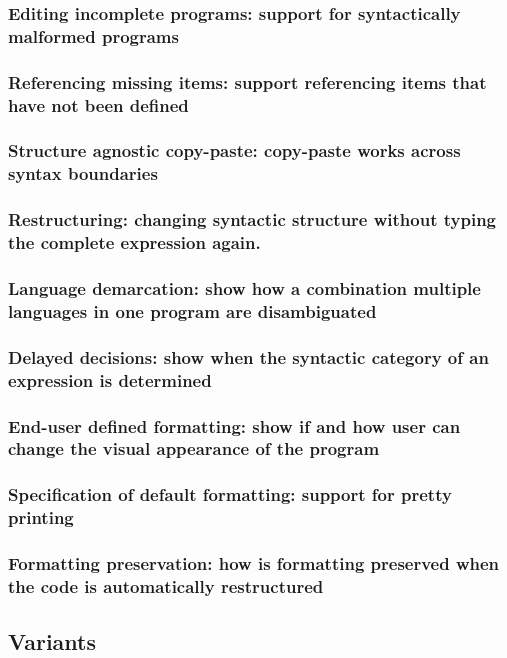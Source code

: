 \documentclass[preprint,numbers,10pt]{sigplanconf}
\begin{document}
\subsubsection{Editing incomplete programs: support for syntactically malformed programs}
\subsubsection{Referencing missing items: support referencing items that have not been defined}
\subsubsection{Structure agnostic copy-paste: copy-paste works across syntax boundaries}
\subsubsection{Restructuring: changing syntactic structure without typing the complete expression again.}
\subsubsection{Language demarcation: show how a combination multiple languages in one program are disambiguated}
\subsubsection{Delayed decisions: show when the syntactic category of an expression is determined}
\subsubsection{End-user defined formatting: show if and how user can change the visual appearance of the program}
\subsubsection{Specification of default formatting: support for pretty printing}
\subsubsection{Formatting preservation: how is formatting preserved when the code is automatically restructured}

\subsection{Variants}
\end{document}
